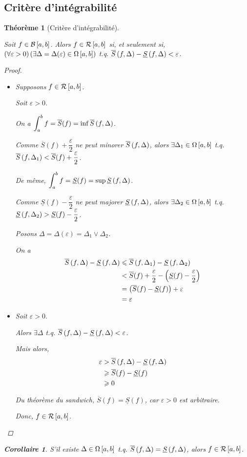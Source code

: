 \documentclass{report}
\newcommand*{\Ssup}[1]{\overline{S}(#1)}
\newcommand*{\Sinf}[1]{\underline{S}(#1)}
\newcommand*{\dint}[3]{\displaystyle\int_{#1}^{#2}#3}
\newcommand*{\raffinement}[2]{#1 \vee #2}
\newcommand*{\eps}{\varepsilon}
\newcommand*{\lte}{\leqslant}
\newcommand*{\gte}{\geqslant}
\newtheorem*{thm}{Th\'eor\`eme}
\newtheorem*{coro}{Corollaire}
\theoremstyle{definition}
\theoremstyle{remark}
\begin{document}
	\subsection{Crit\`ere d'int\'egrabilit\'e}
	\begin{thm}[Crit\`ere d'int\'egrabilit\'e]
		~

		Soit $f \in \bornee$. Alors $f \in \riemann$ si, et seulement si, $\left( \forall \eps >0 \right) \left( \exists\Delta = \Delta(\eps) \in \partitions \right)$ t.q. $\ssup{f}-\sinf{f} < \eps$.
		\begin{proof}~

			\begin{itemize}
				\item[$(\Rightarrow)$] Supposons $f \in \riemann$.

				Soit $\eps>0$.

				On a $\dint{a}{b}{f}=\Ssup{f}=\inf\ssup{f}$.

				Comme $\Ssup{f}+\dfrac{\eps}{2}$ ne peut minorer $\ssup{f}$, alors $\exists\Delta_1 \in \partitions$ t.q. $\ssup{f}[\Delta_1] < \Ssup{f}+\dfrac{\eps}{2}$.

				De m\^eme, $\dint{a}{b}{f}=\Sinf{f}=\sup\sinf{f}$.

				Comme $\Sinf{f}-\dfrac{\eps}{2}$ ne peut majorer $\sinf{f}$, alors $\exists\Delta_2 \in \partitions$ t.q. $\sinf{f}[\Delta_2] > \Sinf{f}-\dfrac{\eps}{2}$.

				Posons $\Delta = \Delta(\eps) = \raffinement{\Delta_1}{\Delta_2}$.

				On a
				\begin{align*}
					\ssup{f} - \sinf{f}&\lte \ssup{f}[\Delta_1] - \sinf{f}[\Delta_2]\\
					&< \Ssup{f} + \dfrac{\eps}{2} - \left( \Sinf{f} - \dfrac{\eps}{2} \right)\\
					&= \left( \Ssup{f} - \Sinf{f} \right) + \eps\\
					&= \eps
				\end{align*}
				\newpage
				\item[$(\Leftarrow)$] Soit $\eps>0$.

				Alors $\exists\Delta$ t.q. $\ssup{f}-\sinf{f}<\eps$.

				Mais alors,
				\begin{align*}
					\eps&> \ssup{f}-\sinf{f}\\
					&\gte \Ssup{f}-\Sinf{f}\\
					&\gte 0
				\end{align*}

				Du th\'eor\`eme du sandwich, $\Ssup{f}=\Sinf{f}$, car $\eps>0$ est arbitraire.

				Donc, $f \in \riemann$.
			\end{itemize}
		\end{proof}
		\begin{coro}
			S'il existe $\Delta \in \partitions$ t.q. $\ssup{f}=\sinf{f}$, alors $f \in \riemann$.
		\end{coro}
	\end{thm}
\end{document}
